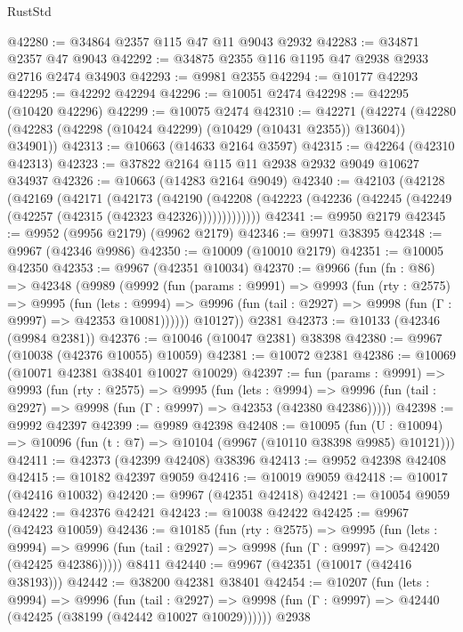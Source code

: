 \begin{lexlean}{RustStd}
\begin{coremodule}
@42280 := @34864 @2357 @115 @47 @11 @9043 @2932
@42283 := @34871 @2357 @47 @9043
@42292 := @34875 @2355 @116 @1195 @47 @2938 @2933 @2716 @2474 @34903
@42293 := @9981 @2355
@42294 := @10177 @42293
@42295 := @42292 @42294
@42296 := @10051 @2474
@42298 := @42295 (@10420 @42296)
@42299 := @10075 @2474
@42310 := @42271
    (@42274 (@42280 (@42283 (@42298 (@10424 @42299) (@10429 (@10431 @2355)) @13604)) @34901))
@42313 := @10663 (@14633 @2164 @3597)
@42315 := @42264 (@42310 @42313)
@42323 := @37822 @2164 @115 @11 @2938 @2932 @9049 @10627 @34937
@42326 := @10663 (@14283 @2164 @9049)
@42340 := @42103
    (@42128
      (@42169
        (@42171
          (@42173
            (@42190
              (@42208 (@42223 (@42236 (@42245 (@42249 (@42257 (@42315 (@42323 @42326)))))))))))))
@42341 := @9950 @2179
@42345 := @9952 (@9956 @2179) (@9962 @2179)
@42346 := @9971 @38395
@42348 := @9967 (@42346 @9986)
@42350 := @10009 (@10010 @2179)
@42351 := @10005 @42350
@42353 := @9967 (@42351 @10034)
@42370 := @9966
    (fun (fn : @86) =>
    @42348
      (@9989
        (@9992
          (fun (params : @9991) =>
          @9993
            (fun (rty : @2575) =>
            @9995
              (fun (lets : @9994) =>
              @9996 (fun (tail : @2927) => @9998 (fun (Γ : @9997) => @42353 @10081))))))
        @10127))
    @2381
@42373 := @10133 (@42346 (@9984 @2381))
@42376 := @10046 (@10047 @2381) @38398
@42380 := @9967 (@10038 (@42376 @10055) @10059)
@42381 := @10072 @2381
@42386 := @10069 (@10071 @42381 @38401 @10027 @10029)
@42397 := fun (params : @9991) =>
  @9993
    (fun (rty : @2575) =>
    @9995
      (fun (lets : @9994) =>
      @9996 (fun (tail : @2927) => @9998 (fun (Γ : @9997) => @42353 (@42380 @42386)))))
@42398 := @9992 @42397
@42399 := @9989 @42398
@42408 := @10095
    (fun (U : @10094) => @10096 (fun (t : @7) => @10104 (@9967 (@10110 @38398 @9985) @10121)))
@42411 := @42373 (@42399 @42408) @38396
@42413 := @9952 @42398 @42408
@42415 := @10182 @42397 @9059
@42416 := @10019 @9059
@42418 := @10017 (@42416 @10032)
@42420 := @9967 (@42351 @42418)
@42421 := @10054 @9059
@42422 := @42376 @42421
@42423 := @10038 @42422
@42425 := @9967 (@42423 @10059)
@42436 := @10185
    (fun (rty : @2575) =>
    @9995
      (fun (lets : @9994) =>
      @9996 (fun (tail : @2927) => @9998 (fun (Γ : @9997) => @42420 (@42425 @42386)))))
    @8411
@42440 := @9967 (@42351 (@10017 (@42416 @38193)))
@42442 := @38200 @42381 @38401
@42454 := @10207
    (fun (lets : @9994) =>
    @9996
      (fun (tail : @2927) =>
      @9998 (fun (Γ : @9997) => @42440 (@42425 (@38199 (@42442 @10027 @10029))))))
    @2938

\end{coremodule}
\end{lexlean}

